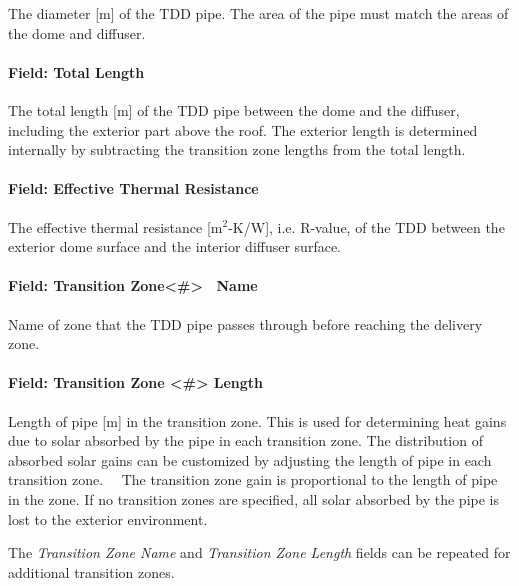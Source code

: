 The diameter {[}m{]} of the TDD pipe. The area of the pipe must match the areas of the dome and diffuser.

\paragraph{Field: Total Length}\label{field-total-length}

The total length {[}m{]} of the TDD pipe between the dome and the diffuser, including the exterior part above the roof. The exterior length is determined internally by subtracting the transition zone lengths from the total length.

\paragraph{Field: Effective Thermal Resistance}\label{field-effective-thermal-resistance}

The effective thermal resistance {[}m\(^{2}\)-K/W{]}, i.e. R-value, of the TDD between the exterior dome surface and the interior diffuser surface.

\paragraph{Field: Transition Zone\textless{}\#\textgreater{}~ Name}\label{field-transition-zone-name}

Name of zone that the TDD pipe passes through before reaching the delivery zone.

\paragraph{Field: Transition Zone \textless{}\#\textgreater{} Length}\label{field-transition-zone-length}

Length of pipe {[}m{]} in the transition zone. This is used for determining heat gains due to solar absorbed by the pipe in each transition zone. The distribution of absorbed solar gains can be customized by adjusting the length of pipe in each transition zone.~~ The transition zone gain is proportional to the length of pipe in the zone. If no transition zones are specified, all solar absorbed by the pipe is lost to the exterior environment.

The \emph{Transition Zone Name} and \emph{Transition Zone Length} fields can be repeated for additional transition zones.

